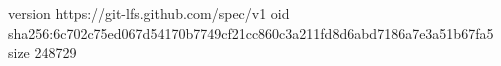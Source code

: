 version https://git-lfs.github.com/spec/v1
oid sha256:6c702c75ed067d54170b7749cf21cc860c3a211fd8d6abd7186a7e3a51b67fa5
size 248729
